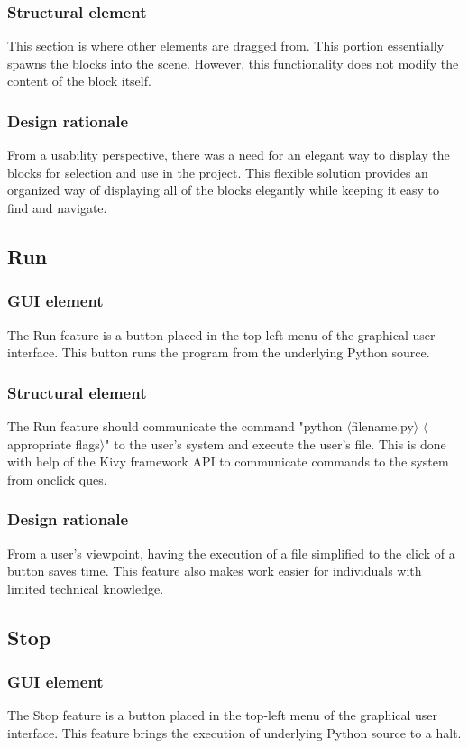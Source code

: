 \documentclass[journal,10pt,onecolumn,compsoc]{IEEEtran} \usepackage[margin=1.0in]{geometry} \usepackage{pdfpages}
\begin{document}
\subsubsection{Structural element}
\noindent This section is where other elements are dragged from.
This portion essentially spawns the blocks into the scene. 
However, this functionality does not modify the content of the block itself.
\subsubsection{Design rationale}
\noindent From a usability perspective, there was a need for an elegant way to display the blocks for selection and use in the project. This flexible solution provides an organized way of displaying all of the blocks elegantly while keeping it easy to find and navigate.
\subsection{Run}
\subsubsection{GUI element}
\noindent The Run feature is a button placed in the top-left menu of the graphical user interface. This button runs the program from the underlying Python source.
\subsubsection{Structural element}
\noindent The Run feature should communicate the command "python $\langle$filename.py$\rangle$ $\langle$appropriate flags$\rangle$" to the user's system and execute the user's file.
This is done with help of the Kivy framework API to communicate commands to the system from onclick ques.\cite{Kivy}
\subsubsection{Design rationale}
\noindent From a user's viewpoint, having the execution of a file simplified to the click of a button saves time. 
This feature also makes work easier for individuals with limited technical knowledge.
\subsection{Stop}
\subsubsection{GUI element}
\noindent The Stop feature is a button placed in the top-left menu of the graphical user interface. This feature brings the execution of underlying Python source to a halt.
\end{document}
